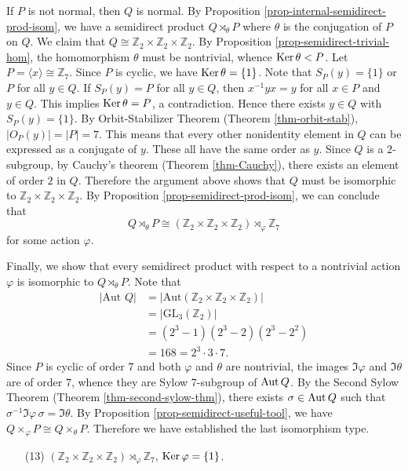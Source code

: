 \begin{example}
	If $P$ is not normal, then $Q$ is normal. By Proposition \ref{prop-internal-semidirect-prod-isom},  we have a semidirect product $Q\rtimes_{\theta} P$ where $\theta$ is the conjugation of $P$ on $Q$. We  claim that $Q\cong \mathbb{Z}_2\times\mathbb{Z}_2\times\mathbb{Z}_2$.  By Proposition \ref{prop-semidirect-trivial-hom},   the homomorphism $\theta$ must be nontrivial, whence $\operatorname{Ker} \theta < P$.  Let $P = \langle x\rangle\cong\mathbb{Z}_7$. Since $P$ is cyclic, we have $\operatorname{Ker} \theta = \{1\}$. Note that $S_P(y) = \{1\}$ or $P$ for all $y\in Q$. If $S_P(y) = P$ for all $y\in Q$, then $x^{-1}yx = y$ for all $x\in P$ and $y\in Q$. This implies $\operatorname{Ker}  \theta = P$, a contradiction. Hence there exists $y\in Q$ with $S_P(y) = \{1\}$. By Orbit-Stabilizer Theorem (Theorem \ref{thm-orbit-stab}), $|O_P(y)| = |P| = 7$. This means that every other nonidentity element in $Q$ can be expressed as a conjugate of $y$. These all have the same order as $y$. Since $Q$ is a $2$-subgroup, by Cauchy's theorem (Theorem \ref{thm-Cauchy}), there exists an element of order $2$ in $Q$. Therefore the argument above shows that $Q$ must be isomorphic to $\mathbb{Z}_2\times\mathbb{Z}_2\times\mathbb{Z}_2$. By Proposition \ref{prop-semidirect-prod-isom}, we can conclude that 
	\begin{equation*}
		Q\rtimes_{\theta} P \cong (\mathbb{Z}_2\times\mathbb{Z}_2\times\mathbb{Z}_2) \rtimes_{\varphi} \mathbb{Z}_7
	\end{equation*}
	for some  action $\varphi$.
	
	Finally, we show that every semidirect product  with respect to a nontrivial action $\varphi$ is isomorphic to $ Q\rtimes_{\theta} P$. Note that
	\begin{align*}
		|\text{Aut } Q| &=|\text{Aut} (\mathbb{Z}_2\times\mathbb{Z}_2\times\mathbb{Z}_2)| 
		\\
		&= |\text{GL}_3(\mathbb{Z}_2)| 
		\\
		&= (2^3-1)(2^3-2)(2^3-2^2) 
		\\
		&= 168 = 2^3\cdot 3\cdot 7.
	\end{align*}  Since $P$ is cyclic of order $7$ and both $\varphi$ and $\theta$ are nontrivial, the images $\Im  \varphi$ and $\Im  \theta$ are of order $7$, whence they are Sylow $7$-subgroup of $\operatorname{Aut}  Q$. By the Second Sylow Theorem (Theorem \ref{thm-second-sylow-thm}), there exists $\sigma\in \operatorname{Aut}  Q$ such that $\sigma^{-1} \Im  \varphi \, \sigma=\Im  \theta$. By Proposition \ref{prop-semidirect-useful-tool}, we have $Q\times_{\varphi} P \cong Q\times_{\theta} P$. Therefore we have established the last isomorphism type.
	\begin{itemize}
		\item[(13)] $(\mathbb{Z}_2\times\mathbb{Z}_2\times\mathbb{Z}_2) \rtimes_{\varphi} \mathbb{Z}_7$, $\operatorname{Ker}\varphi = \{1\}$.
	\end{itemize}
\end{example}




